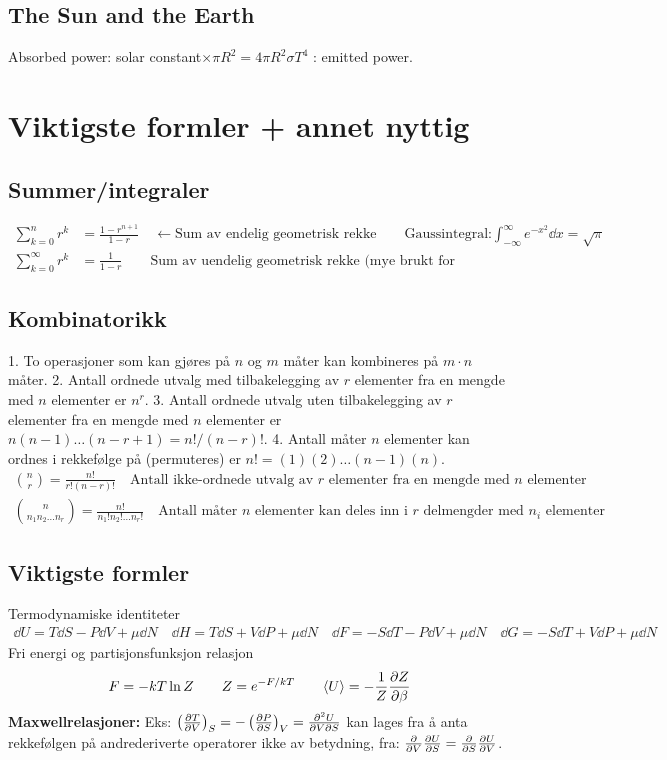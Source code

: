 \documentclass[12pt]{article}
\newcommand{\mean}[1]{\langle #1 \rangle}
\begin{document}
\subsection{The Sun and the Earth}
Absorbed power: solar constant$\times \pi R^2= 4\pi R^2\sigma T^4$ : emitted power.
\section{Viktigste formler + annet nyttig}
\subsection{Summer/integraler}
\begin{align*}
  \sum_{k = 0}^{n} r^k &= \frac{1 - r^{n+1}}{1 - r} \quad \leftarrow \text{Sum av endelig geometrisk rekke} \qquad \text{Gaussintegral:} \int_{-\infty}^\infty e^{-x^2} \dd x = \sqrt{\pi}\\
  \sum_{k = 0}^{\infty} r^k &= \frac{1}{1-r} \qquad \text{Sum av uendelig geometrisk rekke (mye brukt for partisjonsfunksjoner/Gibbssummer)}
\end{align*}
\subsection{Kombinatorikk}
1. To operasjoner som kan gjøres på $n$ og $m$ måter kan kombineres på $m \cdot n$ måter.
2. Antall ordnede utvalg med tilbakelegging av $r$ elementer fra en mengde med $n$ elementer er $n^r$.
3. Antall ordnede utvalg uten tilbakelegging av $r$ elementer fra en mengde med $n$ elementer er $n(n-1)\hdots (n-r+1) = n!/(n-r)!$.
4. Antall måter $n$ elementer kan ordnes i rekkefølge på (permuteres) er $n! = (1)(2)\hdots(n-1)(n)$.
\begin{align*}
  \binom{n}{r} = \frac{n!}{r!(n-r)!} \quad \text{Antall ikke-ordnede utvalg av $r$ elementer fra en mengde med $n$ elementer} \\
  \binom{n}{n_1 n_2 \hdots n_r} = \frac{n!}{n_1! n_2! \hdots n_r!} \quad \text{Antall måter $n$ elementer kan deles inn i $r$ delmengder med $n_i$ elementer}
\end{align*}
\subsection{Viktigste formler}
Termodynamiske identiteter
\begin{align*}
  \boxed{\dd U = T \dd S - P \dd V + \mu \dd N} \quad
  \boxed{\dd H = T \dd S + V \dd P + \mu \dd N} \quad
  \boxed{\dd F = -S \dd T - P \dd V + \mu \dd N} \quad
  \boxed{\dd G = -S \dd T + V \dd P + \mu \dd N}
\end{align*}
Fri energi og partisjonsfunksjon relasjon
\begin{align*}
  F = -kT \ln{Z} \qquad Z = e^{-F/kT} \qquad
  \mean{U} = - \frac{1}{Z} \pdv{Z}{\beta}
\end{align*}
\textbf{Maxwellrelasjoner:} Eks: $\left( \pdv{T}{V} \right)_S = -\left( \pdv{P}{S} \right)_V = \pdv[2]{U}{V}{S}$ kan lages fra å anta rekkefølgen på andrederiverte operatorer
ikke av betydning, fra: $\pdv{V}\pdv{U}{S} = \pdv{S}\pdv{U}{V}$.
\end{document}
